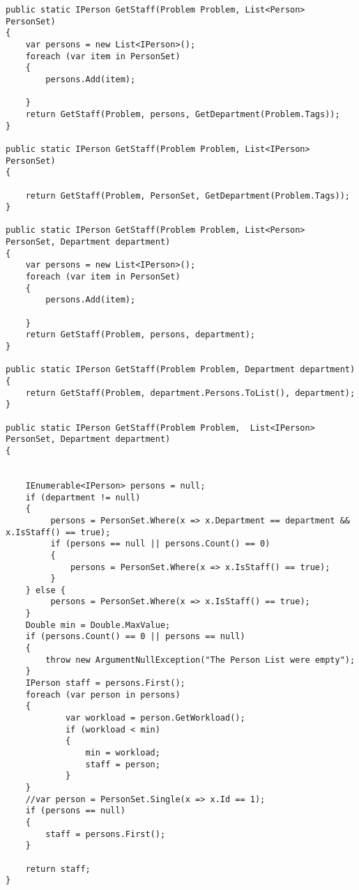 \begin{lstlisting}[style=sourceCode, caption=\myCaption{the \me{GetStaff} method, together with its overloads}, label=lst:getstaff,float=hp]
public static IPerson GetStaff(Problem Problem, List<Person> PersonSet)
{
    var persons = new List<IPerson>();
    foreach (var item in PersonSet)
    {
        persons.Add(item);

    }
    return GetStaff(Problem, persons, GetDepartment(Problem.Tags));
}

public static IPerson GetStaff(Problem Problem, List<IPerson> PersonSet)
{
  
    return GetStaff(Problem, PersonSet, GetDepartment(Problem.Tags));
}

public static IPerson GetStaff(Problem Problem, List<Person> PersonSet, Department department)
{
    var persons = new List<IPerson>();
    foreach (var item in PersonSet)
    {
        persons.Add(item);

    }
    return GetStaff(Problem, persons, department);
}

public static IPerson GetStaff(Problem Problem, Department department)
{
    return GetStaff(Problem, department.Persons.ToList(), department);
}

public static IPerson GetStaff(Problem Problem,  List<IPerson> PersonSet, Department department)
{
    
    
    IEnumerable<IPerson> persons = null;
    if (department != null)
    {
         persons = PersonSet.Where(x => x.Department == department && x.IsStaff() == true);
         if (persons == null || persons.Count() == 0)
         {
             persons = PersonSet.Where(x => x.IsStaff() == true);
         }
    } else {
         persons = PersonSet.Where(x => x.IsStaff() == true);
    }
    Double min = Double.MaxValue;
    if (persons.Count() == 0 || persons == null)
    {
        throw new ArgumentNullException("The Person List were empty");
    }
    IPerson staff = persons.First();
    foreach (var person in persons)
    {
            var workload = person.GetWorkload();
            if (workload < min)
            {
                min = workload;
                staff = person;
            }   
    }
    //var person = PersonSet.Single(x => x.Id == 1);
    if (persons == null)
    {
        staff = persons.First();
    }
   
    return staff;
}
\end{lstlisting}